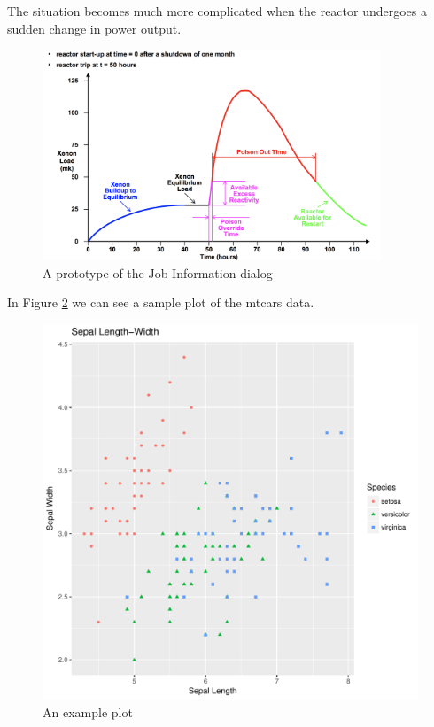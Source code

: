 \documentclass{article}\usepackage[]{graphicx}\usepackage[]{color}
\makeatletter
\def\maxwidth{ %
  \ifdim\Gin@nat@width>\linewidth
    \linewidth
  \else
    \Gin@nat@width
  \fi
}
\newenvironment{knitrout}{}{} %
\makeatother
\begin{document}
The situation becomes much more complicated when the reactor undergoes a sudden change in power output.  

\begin{figure}
\includegraphics[width=0.9\textwidth]{XenonPoison.png}
\caption{A prototype of the Job Information dialog \parencite{garland2005}}
\label{fig:xenon}
\end{figure}

In Figure \ref{fig:ex2} we can see a sample plot of the mtcars data.

\begin{figure}
\begin{knitrout}
\color{fgcolor}

{\centering \includegraphics[width=\maxwidth]{figures/plots-unnamed-chunk-1-1} 

}



\end{knitrout}
\caption{An example plot}
\label{fig:ex2}
\end{figure}
 
\end{document}
